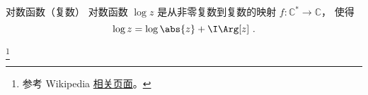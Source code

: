 

\begin{definition}{对数函数（复数）}
对数函数 $\log z$ 是从非零复数到复数的映射 $f:\mathbb C^*\to \mathbb C$， 使得
\begin{equation}
\log z = \log\abs{z} + \I \Arg[z]~.
\end{equation}
\end{definition}

\footnote{参考 Wikipedia \href{https://en.wikipedia.org/wiki/Complex_logarithm}{相关页面}。}
